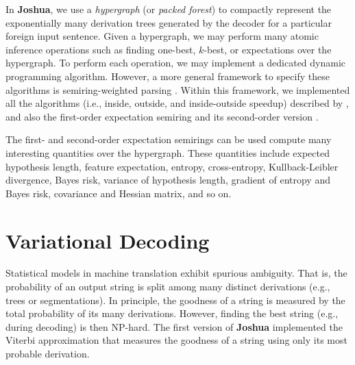 \documentclass[11pt]{article}
\newcommand{\joshua}{\textbf{Joshua}\xspace}
\begin{document}
In \joshua, we use a {\em hypergraph} (or {\em packed forest}) to compactly 
represent the exponentially many derivation trees generated by the decoder for a 
particular foreign input sentence.
Given a hypergraph, we may perform many atomic inference operations
such as finding one-best, $k$-best, or expectations over the hypergraph.
To perform each operation, we may implement a dedicated dynamic programming algorithm.
However, a more general framework to specify these algorithms is semiring-weighted parsing \cite{semiringparsing}.
Within this framework, we implemented all the algorithms (i.e.,
inside, outside, and inside-outside speedup) described by ,
and also the first-order expectation semiring \cite{eisner-expectation-semiring} and its
second-order version \cite{li-eisner:2009:EMNLP}.


The first- and second-order expectation semirings can be used compute many interesting quantities over the hypergraph.
These quantities include expected hypothesis length, feature expectation, entropy, cross-entropy, Kullback-Leibler divergence,
Bayes risk, variance of hypothesis length, gradient of entropy and Bayes risk, covariance and Hessian matrix, and so on.


\section{Variational Decoding}

Statistical models in machine translation exhibit spurious ambiguity.
That is, the probability of an output string is split
among many distinct derivations (e.g., trees or
segmentations). In principle, the goodness of a
string is measured by the total probability of its
many derivations. However, finding the best string
(e.g., during decoding) is then NP-hard.
The first version of \joshua implemented the
Viterbi approximation that measures the goodness 
of a string using only its most probable derivation.
\end{document}
